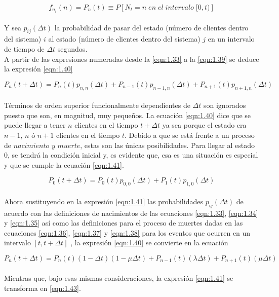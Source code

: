 \begin{equation}
    f_{n_{t}}\left ( n \right )=P_{n}\left ( t \right )\equiv P\left [ N_{t}=n\; en\; el\; intervalo\; [0,t) \right ]
    \label{eqn:1.39}
\end{equation}
\\
Y sea $p_{ij}\left ( \Delta t \right )$ la probabilidad de pasar del estado (número de clientes dentro del sistema) $i$ al estado (número de clientes dentro del sistema) $j$ en un intervalo de tiempo de $\Delta t$ segundos.
\\
A partir de las expresiones numeradas desde la \ref{eqn:1.33} a la \ref{eqn:1.39} se deduce la expresión \ref{eqn:1.40}

\begin{equation}
    P_{n}\left ( t+\Delta t \right )
    = P_{n}\left ( t \right ) p_{n,n}\left ( \Delta t \right )+P_{n-1}\left ( t \right )p_{n-1,n}\left ( \Delta t \right )+P_{n+1}\left ( t \right )p_{n+1,n}\left ( \Delta t \right )
    \label{eqn:1.40}
\end{equation}
\\
Términos de orden superior funcionalmente dependientes de $\Delta t$ son ignorados puesto que son, en magnitud, muy pequeños. La ecuación \ref{eqn:1.40} dice que se puede llegar a tener $n$ clientes en el tiempo
$t+\Delta t$ ya sea porque el estado era $n-1$, $n$ ó $n+1$ clientes en el tiempo $t$. Debido a que se está frente a un proceso de $nacimiento$ $y$ $muerte$, estas son las únicas posibilidades. Para llegar al estado 0, se tendrá la condición inicial y, es evidente que, esa es una situación es especial y que se cumple la ecuación \ref{eqn:1.41}.

 \begin{equation}
     P_{0}(t+\Delta t)=P_{0}(t)p_{0,0}(\Delta t)+P_{1}(t)p_{1,0}(\Delta t)
     \label{eqn:1.41}
 \end{equation}
 \\
 Ahora sustituyendo en la expresión \ref{eqn:1.41} las probabilidades
 $p_{ij}(\Delta t)$ de acuerdo con las definiciones de nacimientos de las ecuaciones \ref{eqn:1.33}, \ref{eqn:1.34} y \ref{eqn:1.35} así como las 
definiciones para el proceso de muertes dadas en las ecuaciones \ref{eqn:1.36}, \ref{eqn:1.37} y \ref{eqn:1.38} para los eventos que ocurren en un intervalo $[t,t+\Delta t]$ , la expresión \ref{eqn:1.40} se convierte en la ecuación

\begin{equation}
    P_{n}(t+\Delta t)=P_{n}(t)(1-\Delta t)(1-\mu \Delta t)+P_{n-1}(t)(\lambda \Delta t)+P_{n+1}(t)(\mu \Delta t)
    \label{eqn:1.42}
\end{equation}
\\
Mientras que, bajo esas mismas consideraciones, la expresión \ref{eqn:1.41} se transforma en \ref{eqn:1.43}.

